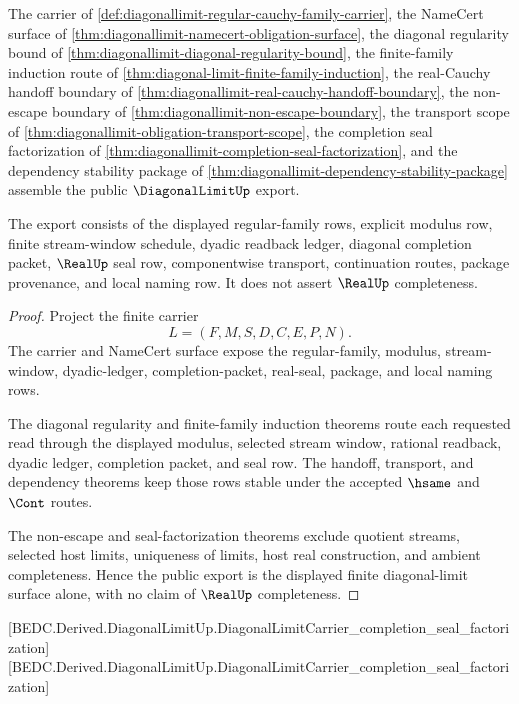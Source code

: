 \begin{theorem}
\label{thm:diagonal-limit-public-export}
The carrier of \autoref{def:diagonallimit-regular-cauchy-family-carrier}, the NameCert surface of \autoref{thm:diagonallimit-namecert-obligation-surface}, the diagonal regularity bound of \autoref{thm:diagonallimit-diagonal-regularity-bound}, the finite-family induction route of \autoref{thm:diagonal-limit-finite-family-induction}, the real-Cauchy handoff boundary of \autoref{thm:diagonallimit-real-cauchy-handoff-boundary}, the non-escape boundary of \autoref{thm:diagonallimit-non-escape-boundary}, the transport scope of \autoref{thm:diagonallimit-obligation-transport-scope}, the completion seal factorization of \autoref{thm:diagonallimit-completion-seal-factorization}, and the dependency stability package of \autoref{thm:diagonallimit-dependency-stability-package} assemble the public $\DiagonalLimitUp$ export.

The export consists of the displayed regular-family rows, explicit modulus row, finite stream-window schedule, dyadic readback ledger, diagonal completion packet, $\RealUp$ seal row, componentwise transport, continuation routes, package provenance, and local naming row. It does not assert $\RealUp$ completeness.
\end{theorem}
\begin{proof}
Project the finite carrier
$$
L=(F,M,S,D,C,E,P,N).
$$
The carrier and NameCert surface expose the regular-family, modulus, stream-window, dyadic-ledger, completion-packet, real-seal, package, and local naming rows.

The diagonal regularity and finite-family induction theorems route each requested read through the displayed modulus, selected stream window, rational readback, dyadic ledger, completion packet, and seal row. The handoff, transport, and dependency theorems keep those rows stable under the accepted $\hsame$ and $\Cont$ routes.

The non-escape and seal-factorization theorems exclude quotient streams, selected host limits, uniqueness of limits, host real construction, and ambient completeness. Hence the public export is the displayed finite diagonal-limit surface alone, with no claim of $\RealUp$ completeness.
\end{proof}

[BEDC.Derived.DiagonalLimitUp.DiagonalLimitCarrier\_completion\_seal\_factorization]
[BEDC.Derived.DiagonalLimitUp.DiagonalLimitCarrier\_completion\_seal\_factorization]

